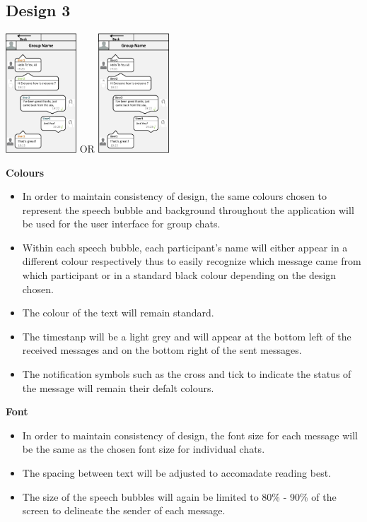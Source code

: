 \documentclass[11pt]{article}
\begin{document}
\subsection{Design 3}
\includegraphics[width=100px]{D03.jpg}  OR  \includegraphics[width=100px]{D03_1.jpg}


\textbf{Colours}\\
\begin{itemize}
\item	In order to maintain consistency of design, the same colours chosen to represent the speech bubble and background throughout the application will be used for the user interface for group chats.
\item	Within each speech bubble, each participant’s name will either appear in a different colour respectively thus to easily recognize which message came from which participant or in a standard black colour depending on the design chosen.
\item	The colour of the text will remain standard.
\item The timestanp will be a light grey and will appear at the bottom left of the received  messages and on the bottom right of the sent messages.
\item The notification symbols such as the cross and tick to indicate the status of the message will remain their defalt colours.\\
\end{itemize}

\textbf{Font}\\
\begin{itemize}
\item	In order to maintain consistency of design, the font size for each message will be the same as the chosen font size for individual chats.
\item The spacing between text will be adjusted to accomadate reading best.
\item	The size of the speech bubbles will again be limited to 80\% - 90\% of the screen to delineate the sender of each message. \\
\end{itemize}
\end{document}
